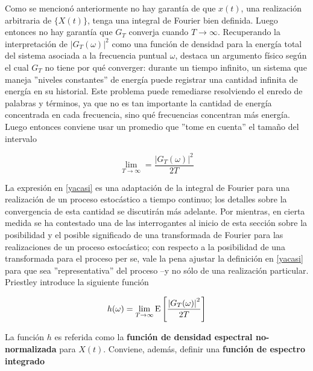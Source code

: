 Como se mencion\'o anteriormente no hay garant\'ia de que $x(t)$, una realizaci\'on arbitraria de
$\{X(t)\}$, tenga una integral de Fourier bien definida. Luego entonces no hay garant\'ia que 
$G_T$ converja cuando $T\rightarrow \infty$. Recuperando la interpretaci\'on de 
$\left| G_T(\omega) \right|^{2}$ como una funci\'on de densidad para la energ\'ia total del sistema 
asociada a la frecuencia
puntual $\omega$, destaca un argumento f\'isico seg\'un el cual $G_T$ no tiene por qu\'e converger:
durante un tiempo infinito, un sistema que maneja ''niveles constantes'' de 
energ\'ia puede registrar una cantidad infinita de energ\'ia en su historial. 
Este problema puede remediarse resolviendo el enredo de palabras y t\'erminos, 
ya que no es tan importante la
cantidad de energ\'ia concentrada en cada frecuencia, sino qu\'e frecuencias concentran m\'as
energ\'ia. Luego entonces conviene usar un promedio que ''tome en cuenta'' el tama\~no
del intervalo

\begin{equation}
\lim_{T\rightarrow{\infty}} = \frac{ \left| G_T(\omega) \right|^{2}}{2 T}
\label{yacasi}
\end{equation}

La expresi\'on en \ref{yacasi} es una adaptaci\'on de la integral de Fourier para una realizaci\'on
de un proceso estoc\'astico a tiempo continuo; los detalles sobre la convergencia de esta 
cantidad se discutir\'an m\'as adelante.
Por mientras, en cierta medida se ha contestado una de las interrogantes al inicio de esta 
secci\'on sobre la posibilidad y
el posible significado de una transformada de Fourier para las realizaciones de un proceso 
estoc\'astico; con respecto a la posibilidad de una transformada para el proceso per se, vale la 
pena
ajustar la definici\'on en \ref{yacasi} para que sea ''representativa'' del proceso --y no s\'olo
de una realizaci\'on particular. Priestley introduce la siguiente funci\'on

\begin{equation}
h(\omega) = \lim_{T\rightarrow \infty} \mathrm{E}\left[  \frac{ \left| G_T(\omega) \right|^{2}}{2 T}  \right]
\end{equation}

La funci\'on $h$ es referida como la \textbf{funci\'on de densidad espectral no-normalizada} para
$X(t)$. Conviene, adem\'as, definir una \textbf{funci\'on de espectro integrado}


